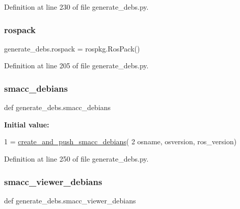 Definition at line 230 of file generate\+\_\+debs.\+py.

\mbox{\label{namespacegenerate__debs_a609fa33c1ebbff173ec90524eeb7b49d}} 
\subsubsection{\texorpdfstring{rospack}{rospack}}
{\footnotesize\ttfamily generate\+\_\+debs.\+rospack = rospkg.\+Ros\+Pack()}



Definition at line 205 of file generate\+\_\+debs.\+py.

\mbox{\label{namespacegenerate__debs_acca5eaf9f83b81a32c26c7a7c5f9bdd7}} 
\subsubsection{\texorpdfstring{smacc\+\_\+debians}{smacc\_debians}}
{\footnotesize\ttfamily def generate\+\_\+debs.\+smacc\+\_\+debians}

{\bfseries Initial value\+:}
\begin{DoxyCode}
1 =  \hyperlink{namespacegenerate__debs_af7237c463c8e5b4df369e6befc154c50}{create\_and\_push\_smacc\_debians}(
2         osname, osversion, ros\_version)
\end{DoxyCode}


Definition at line 250 of file generate\+\_\+debs.\+py.

\mbox{\label{namespacegenerate__debs_a9ac114fabb6011d255a814a7919e64ae}} 
\subsubsection{\texorpdfstring{smacc\+\_\+viewer\+\_\+debians}{smacc\_viewer\_debians}}
{\footnotesize\ttfamily def generate\+\_\+debs.\+smacc\+\_\+viewer\+\_\+debians}

